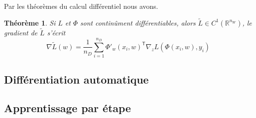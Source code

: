 \documentclass[11pt,a4paper, french]{article}
\newcommand{\nparammodel}{n_W}
\newcommand{\ndata}{n_D}
\newcommand{\R}{\mathbb R}
\newcommand{\transpose}[1]{{#1}^{\mathsf{T}}}
\newtheorem{theorem}{Théorème}[section]
\begin{document}
Par les théorèmes du calcul différentiel nous avons.
%
\begin{theorem}\label{theorem:}
Si $L$ et $\Phi$ sont continûment différentiables, alors   $\widetilde{L}\in C^1(\R^{\nparammodel})$, le gradient de $\widetilde{L}$ s'écrit
%
\begin{equation}\label{equation:}
\nabla  \widetilde{L}(w) = \frac{1}{\ndata}\sum_{i=1}^{\ndata} \transpose{\Phi'_w(x_i,w)}\nabla_z L(\Phi(x_i,w),y_i)
\end{equation}
%
\end{theorem}
%
%
\subsection{Différentiation automatique}\label{subsec:}
%
%
\subsection{Apprentissage par étape}\label{subsec:}
%
%
%
\end{document}
